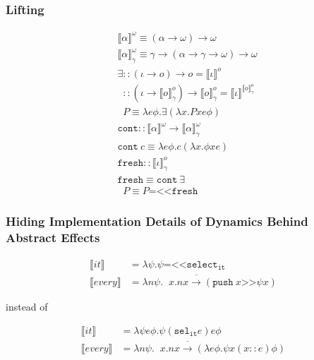 \documentclass{beamer}
\newcommand{\dimpl}{\mathbin{\overline{\to}}}
\newcommand{\dexists}{\mathop{\overline{\exists}}}
\newcommand{\dforall}{\mathop{\overline{\forall}}}
\newcommand{\hsrevbind}{\mathbin{\texttt{=<<}}}
\newcommand{\hsseq}{\mathbin{\texttt{>>}}}
\newcommand{\occons}{\mathbin{::}}
\newcommand{\statecps}[3]{\llbracket #3 \rrbracket^{#2}_{#1}}
\newcommand{\cps}[2]{\llbracket #2 \rrbracket^{#1}}
\newcommand{\sem}[1]{\llbracket #1 \rrbracket}
\begin{document}
\begin{frame}
  \frametitle{Lifting}

\begin{align*}
& \cps{\omega}{\alpha} \equiv (\alpha \to \omega) \to \omega \\
& \statecps{\gamma}{\omega}{\alpha} \equiv \gamma \to (\alpha \to \gamma \to \omega) \to \omega \\
& \exists :: (\iota \to o) \to o = \cps{o}{\iota} \\
& \dexists :: (\iota \to \statecps{\gamma}{o}{o}) \to \statecps{\gamma}{o}{o}
  = \cps{\statecps{\gamma}{o}{o}}{\iota} \\
& \dexists P \equiv \lambda e \phi. \exists (\lambda x. P x e \phi) \\
& \texttt{cont} :: \cps{\omega}{\alpha} \to \statecps{\gamma}{\omega}{\alpha} \\
& \texttt{cont}\ c \equiv \lambda e \phi. c (\lambda x. \phi x e) \\
& \texttt{fresh} :: \statecps{\gamma}{o}{\iota} \\
& \texttt{fresh} \equiv \texttt{cont}\ \exists \\
& \dexists P \equiv P \hsrevbind \texttt{fresh}
\end{align*}

\end{frame}


\begin{frame}
  \frametitle{Hiding Implementation Details of Dynamics Behind Abstract Effects}

    \begin{align*}
      \sem{it} & = \lambda \psi. \psi \hsrevbind \texttt{select}_\texttt{it} \\
      \sem{every} & = \lambda n \psi.
        \dforall x. n x \dimpl (\texttt{push}\ x \hsseq \psi x)
    \end{align*}

    instead of

    \begin{align*}
       \sem{it} & = \lambda \psi e \phi. \psi (\texttt{sel}_\texttt{it} e) e \phi \\
       \sem{every} & = \lambda n \psi.
         \dforall x. n x \dimpl (\lambda e \phi. \psi x (x \occons e) \phi)
    \end{align*}
\end{frame}

\end{document}
